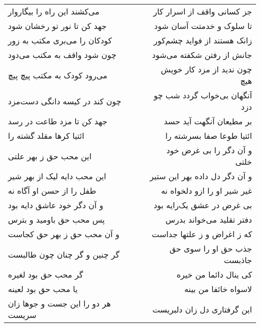 \begin{center}
\begin{longtable}{l p{0.5cm} r}
می‌کشند این راه را بیگاروار
&&
جز کسانی واقف از اسرار کار
\\
جهد کن تا نور تو رخشان شود
&&
تا سلوک و خدمتت آسان شود
\\
کودکان را می‌بری مکتب به زور
&&
زانک هستند از فواید چشم‌کور
\\
چون شود واقف به مکتب می‌دود
&&
جانش از رفتن شکفته می‌شود
\\
می‌رود کودک به مکتب پیچ پیچ
&&
چون ندید از مزد کار خویش هیچ
\\
چون کند در کیسه دانگی دست‌مزد
&&
آنگهان بی‌خواب گردد شب چو دزد
\\
جهد کن تا مزد طاعت در رسد
&&
بر مطیعان آنگهت آید حسد
\\
ائتیا کرها مقلد گشته را
&&
ائتیا طوعا صفا بسرشته را
\\
این محب حق ز بهر علتی
&&
و آن دگر را بی غرض خود خلتی
\\
این محب دایه لیک از بهر شیر
&&
و آن دگر دل داده بهر این ستیر
\\
طفل را از حسن او آگاه نه
&&
غیر شیر او را ازو دلخواه نه
\\
و آن دگر خود عاشق دایه بود
&&
بی غرض در عشق یک‌رایه بود
\\
پس محب حق باومید و بترس
&&
دفتر تقلید می‌خواند بدرس
\\
و آن محب حق ز بهر حق کجاست
&&
که ز اغراض و ز علتها جداست
\\
گر چنین و گر چنان چون طالبست
&&
جذب حق او را سوی حق جاذبست
\\
گر محب حق بود لغیره
&&
کی ینال دائما من خیره
\\
یا محب حق بود لعینه
&&
لاسواه خائفا من بینه
\\
هر دو را این جست و جوها زان سریست
&&
این گرفتاری دل زان دلبریست
\\
\end{longtable}
\end{center}
